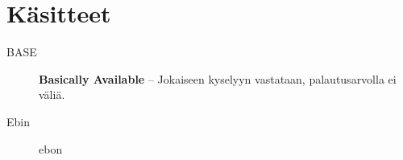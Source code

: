 \section*{Käsitteet}
\begin{description}
	\item[BASE] \hfill 
			
	\textbf{Basically Available} -- Jokaiseen kyselyyn vastataan, palautusarvolla ei väliä.
	\item[Ebin] \hfill
	ebon 
\end{description}
